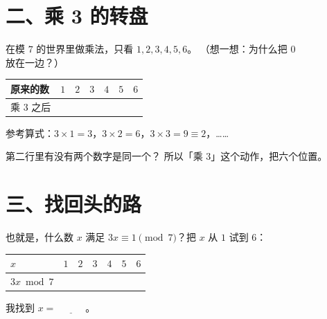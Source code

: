 \section*{二、乘 3 的转盘}

\noindent 在模 \(7\) 的世界里做乘法，只看 \(1,2,3,4,5,6\)。
（想一想：为什么把 \(0\) 放在一边？）

\begin{dongshou}
  \begin{center}
  \begin{tabular}{@{}lcccccc@{}}
    \toprule
    原来的数 & \(1\) & \(2\) & \(3\) & \(4\) & \(5\) & \(6\) \\
    \midrule
    乘 \(3\) 之后 & \hspace{1.2em} & \hspace{1.2em} & \hspace{1.2em} & \hspace{1.2em} & \hspace{1.2em} & \hspace{1.2em} \\
    \bottomrule
  \end{tabular}
  \end{center}
  参考算式：\(3\times1=3\)，\(3\times2=6\)，\(3\times3=9\equiv2\)，……
\end{dongshou}

\begin{sikao}
  第二行里有没有两个数字是同一个？
  所以「乘 \(3\)」这个动作，把六个位置\underline{\hspace{6em}}。
\end{sikao}

\section*{三、找回头的路}

\begin{sikao}[谁是 3 的逆元？]
  也就是，什么数 \(x\) 满足 \(3x\equiv1\pmod7\)？把 \(x\) 从 \(1\) 试到 \(6\)：
  \begin{center}
  \begin{tabular}{@{}lcccccc@{}}
    \toprule
    \(x\) & \(1\) & \(2\) & \(3\) & \(4\) & \(5\) & \(6\) \\
    \midrule
    \(3x \bmod 7\) & \hspace{1.2em} & \hspace{1.2em} & \hspace{1.2em} & \hspace{1.2em} & \hspace{1.2em} & \hspace{1.2em} \\
    \bottomrule
  \end{tabular}
  \end{center}
  我找到 \(x=\underline{\hspace{3em}}\)。
\end{sikao}

